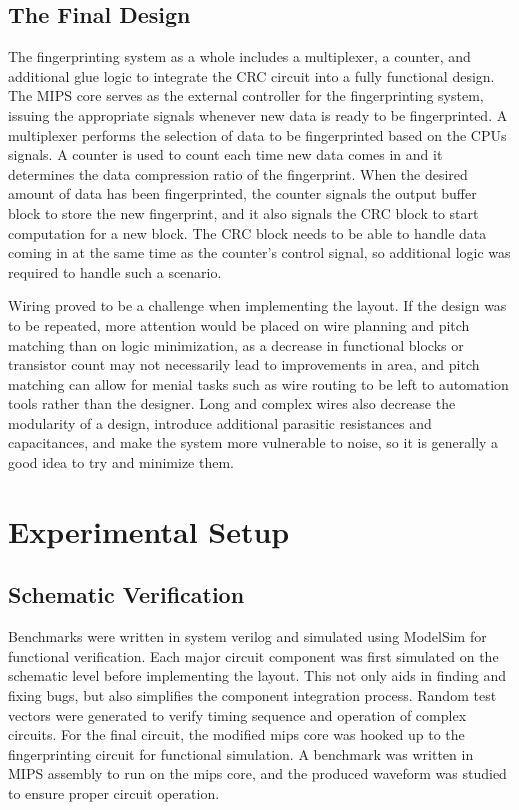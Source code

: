 \documentclass[10pt,journal,compsoc]{IEEEtran}
\begin{document}
\subsection{The Final Design}
The fingerprinting system as a whole includes a multiplexer, a counter, and additional glue logic to integrate the CRC circuit into a fully functional design. The MIPS core serves as the external controller for the fingerprinting system, issuing the appropriate signals whenever new data is ready to be fingerprinted. A multiplexer performs the selection of data to be fingerprinted based on the CPUs signals. A counter is used to count each time new data comes in and it determines the data compression ratio of the fingerprint. When the desired amount of data has been fingerprinted, the counter signals the output buffer block to store the new fingerprint, and it also signals the CRC block to start computation for a new block. The CRC block needs to be able to handle data coming in at the same time as the counter's control signal, so additional logic was required to handle such a scenario. 

Wiring proved to be a challenge when implementing the layout. If the design was to be repeated, more attention would be placed on wire planning and pitch matching than on logic minimization, as a decrease in functional blocks or transistor count may not necessarily lead to improvements in area, and pitch matching can allow for menial tasks such as wire routing to be left to automation tools rather than the designer. Long and complex wires also decrease the modularity of a design, introduce additional parasitic resistances and capacitances, and make the system more vulnerable to noise, so it is generally a good idea to try and minimize them.


\section{Experimental Setup}
\subsection{Schematic Verification}
Benchmarks were written in system verilog and simulated using ModelSim for functional verification. Each major circuit component was first simulated on the schematic level before implementing the layout. This not only aids in finding and fixing bugs, but also simplifies the component integration process. Random test vectors were generated to verify timing sequence and operation of complex circuits.
For the final circuit, the modified mips core was hooked up to the fingerprinting circuit for functional simulation. A benchmark was written in MIPS assembly to run on the mips core, and the produced waveform was studied to ensure proper circuit operation. 
\end{document}
